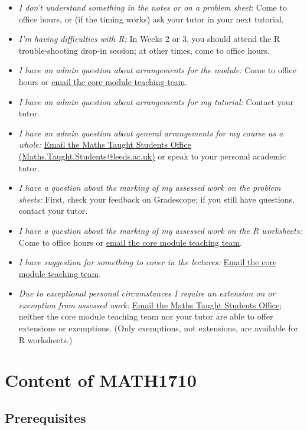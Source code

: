 \documentclass[
  a4paper,
]{book}
\providecommand{\tightlist}{%
  \setlength{\itemsep}{0pt}\setlength{\parskip}{0pt}}
\theoremstyle{definition}
\theoremstyle{definition}
\theoremstyle{definition}
\theoremstyle{definition}
\theoremstyle{remark}
\begin{document}
\begin{itemize}
\tightlist
\item
  \emph{I don't understand something in the notes or on a problem sheet}: Come to office hours, or (if the timing works) ask your tutor in your next tutorial.
\item
  \emph{I'm having difficulties with R:} In Weeks 2 or 3, you should attend the R trouble-shooting drop-in session; at other times, come to office hours.
\item
  \emph{I have an admin question about arrangements for the module:} Come to office hours or \href{mailto:math1710@leeds.ac.uk}{email the core module teaching team}.
\item
  \emph{I have an admin question about arrangements for my tutorial:} Contact your tutor.
\item
  \emph{I have an admin question about general arrangements for my course as a whole:} \href{mailto:Maths.Taught.Students@leeds.ac.uk}{Email the Maths Taught Students Office (Maths.Taught.Students@leeds.ac.uk)} or speak to your personal academic tutor.
\item
  \emph{I have a question about the marking of my assessed work on the problem sheets:} First, check your feedback on Gradescope; if you still have questions, contact your tutor.
\item
  \emph{I have a question about the marking of my assessed work on the R worksheets:} Come to office hours or \href{mailto:math1710@leeds.ac.uk}{email the core module teaching team}.
\item
  \emph{I have suggestion for something to cover in the lectures:} \href{mailto:math1710@leeds.ac.uk}{Email the core module teaching team}.
\item
  \emph{Due to exceptional personal circumstances I require an extension on or exemption from assessed work:} \href{mailto:Maths.Taught.Students@leeds.ac.uk}{Email the Maths Taught Students Office}; neither the core module teaching team nor your tutor are able to offer extensions or exemptions. (Only exemptions, not extensions, are available for R worksheets.)
\end{itemize}

\hypertarget{about-content}{%
\section*{Content of MATH1710}\label{about-content}}

\hypertarget{prereqs}{%
\subsection*{Prerequisites}\label{prereqs}}
\end{document}
